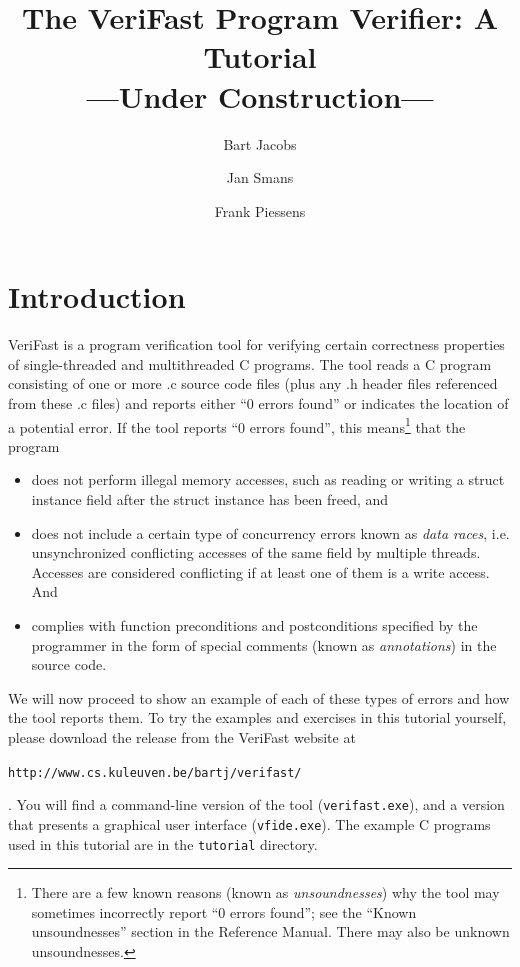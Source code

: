 \documentclass{article}
\title{The VeriFast Program Verifier: A Tutorial\\
---Under Construction---}
\author{Bart Jacobs \and Jan Smans \and Frank Piessens}
\begin{document}
\maketitle

\section{Introduction}

VeriFast is a program verification tool for verifying certain
correctness properties of single-threaded and multithreaded C
programs. The tool reads a C program consisting of one or more
.c source code files (plus any .h header files referenced from
these .c files) and reports either ``0 errors found'' or
indicates the location of a potential error. If the tool
reports ``0 errors found'', this means\footnote{There are a few
known reasons (known as \emph{unsoundnesses}) why the tool may
sometimes incorrectly report ``0 errors found''; see the
``Known unsoundnesses'' section in the Reference Manual. There
may also be unknown unsoundnesses.} that the program
\begin{itemize}
\item does not perform illegal memory accesses, such as
    reading or writing a struct instance field after the
    struct instance has been freed, and
\item does not include a certain type of concurrency errors
    known as \emph{data races}, i.e. unsynchronized
    conflicting accesses of the same field by multiple
    threads. Accesses are considered conflicting if at
    least one of them is a write access. And
\item complies with function preconditions and
    postconditions specified by the programmer in the form
    of special comments (known as \emph{annotations}) in
    the source code.
\end{itemize}

We will now proceed to show an example of each of these types
of errors and how the tool reports them. To try the examples
and exercises in this tutorial yourself, please download the
release from the VeriFast website at
\begin{center}
\texttt{http://www.cs.kuleuven.be/bartj/verifast/}
\end{center}
. You will find a command-line version of the tool
(\texttt{verifast.exe}), and a version that presents a
graphical user interface (\texttt{vfide.exe}). The example C
programs used in this tutorial are in the \texttt{tutorial}
directory.
\end{document}
